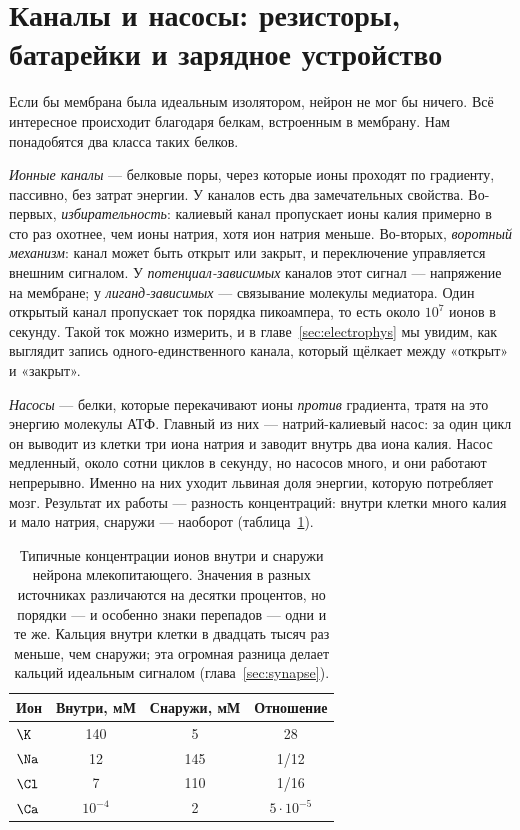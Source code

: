 \section{Каналы и насосы: резисторы, батарейки и зарядное устройство}

Если бы мембрана была идеальным изолятором, нейрон не мог бы ничего. Всё интересное происходит благодаря белкам, встроенным в мембрану. Нам понадобятся два класса таких белков.

\emph{Ионные каналы} --- белковые поры, через которые ионы проходят по градиенту, пассивно, без затрат энергии. У каналов есть два замечательных свойства. Во-первых, \emph{избирательность}: калиевый канал пропускает ионы калия примерно в сто раз охотнее, чем ионы натрия, хотя ион натрия меньше. Во-вторых, \emph{воротный механизм}: канал может быть открыт или закрыт, и переключение управляется внешним сигналом. У \emph{потенциал-зависимых} каналов этот сигнал --- напряжение на мембране; у \emph{лиганд-зависимых} --- связывание молекулы медиатора. Один открытый канал пропускает ток порядка пикоампера, то есть около $10^7$ ионов в секунду. Такой ток можно измерить, и в главе~\ref{sec:electrophys} мы увидим, как выглядит запись одного-единственного канала, который щёлкает между «открыт» и «закрыт».

\emph{Насосы} --- белки, которые перекачивают ионы \emph{против} градиента, тратя на это энергию молекулы АТФ. Главный из них --- натрий-калиевый насос: за один цикл он выводит из клетки три иона натрия и заводит внутрь два иона калия. Насос медленный, около сотни циклов в секунду, но насосов много, и они работают непрерывно. Именно на них уходит львиная доля энергии, которую потребляет мозг. Результат их работы --- разность концентраций: внутри клетки много калия и мало натрия, снаружи --- наоборот (таблица~\ref{tab:concentrations}).

\begin{table}[t]
\centering
\begin{tabular}{lccc}
\toprule
Ион & Внутри, мМ & Снаружи, мМ & Отношение \\
\midrule
$\K$  & 140 & 5   & 28 \\
$\Na$ & 12  & 145 & 1/12 \\
$\Cl$ & 7   & 110 & 1/16 \\
$\Ca$ & $10^{-4}$ & 2 & $5\cdot10^{-5}$ \\
\bottomrule
\end{tabular}
\caption{Типичные концентрации ионов внутри и снаружи нейрона млекопитающего. Значения в разных источниках различаются на десятки процентов, но порядки --- и особенно знаки перепадов --- одни и те же. Кальция внутри клетки в двадцать тысяч раз меньше, чем снаружи; эта огромная разница делает кальций идеальным сигналом (глава~\ref{sec:synapse}).}
\label{tab:concentrations}
\end{table}

